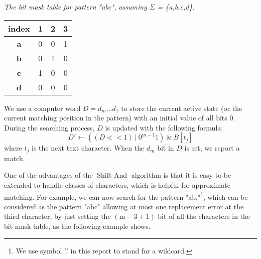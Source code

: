 \begin{example}\emph{The bit mask table for pattern "abc", assuming $\Sigma$ = \{a,b,c,d\}.}

\begin{table}[H]
	\centering
	\begin{tabular}{|c|c|c|c|}
		\hline
		index      & 1                        & 2                        & 3                        \\ \hline
		\textbf{a} & 0                        & 0                        & {\color[HTML]{3531FF} 1} \\ \hline
		\textbf{b} & 0                        & {\color[HTML]{3531FF} 1} & 0                        \\ \hline
		\textbf{c} & {\color[HTML]{3531FF} 1} & 0                        & 0                        \\ \hline
		\textbf{d} & 0                        & 0                        & 0                        \\ \hline
	\end{tabular}
	\label{table-bitmask}
\end{table}
\end{example}

We use a computer word $D = d_m...d_1$ to store the current active state (or the current matching position in the pattern) with an initial value of all bits 0. During the searching process, $D$ is updated with the following formula: 
$$D' \leftarrow ((D << 1) \ | \ 0^{m-1}1) \ \& \ B[t_j]$$
where $t_j$ is the next text character.  When the $d_m$ bit in $D$ is set, we report a match. 

One of the advantages of the $\operatorname{Shift-And}$ algorithm is that it is easy to be extended to handle classes of characters, which is helpful for approximate matching. 
For example, we can now search for the pattern "ab."\footnote{ We use symbol '.' in this report to stand for a wildcard.}, which can be considered as the pattern "abc" allowing at most one replacement error at the third character, by just setting the $\operatorname{(m-3+1)}$ bit of all the characters in the bit mask table, as the following example shows. 

